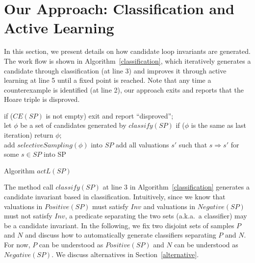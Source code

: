 \section{Our Approach: Classification and Active Learning}
\label{sec:classifierlearning}
In this section, we present details on how candidate loop invariants are generated. The work flow is shown in Algorithm~\ref{classification}, which iteratively generates a candidate through classification (at line 3) and improves it through active learning at line 5 until a fixed point is reached. Note that any time a counterexample is identified (at line 2), our approach exits and reports that the Hoare triple is disproved.

\begin{algorithm}[t]
\SetAlgoVlined
\Indm
\Indp
{} {
    if ($CE(SP)$ is not empty) { exit and report ``disproved''; } \\
    let $\phi$ be a set of candidates generated by $classify(SP)$\;
    if ($\phi$ is the same as last iteration){ return $\phi$; } \\
    add $selectiveSampling(\phi)$ into $SP$\;
    add all valuations $s'$ such that $s \Rightarrow s'$ for some $s \in SP$ into SP\;
}
\caption{Algorithm $actL(SP)$}
\label{classification}
\end{algorithm}

The method call $classify(SP)$ at line 3 in Algorithm~\ref{classification} generates a candidate invariant based in classification. Intuitively, since we know that valuations in $Positive(SP)$ must satisfy $Inv$ and valuations in $Negative(SP)$ must not satisfy $Inv$, a predicate separating the two sets (a.k.a.~a classifier) may be a candidate invariant. In the following, we fix two disjoint sets of samples $P$ and $N$ and discuss how to automatically generate classifiers separating $P$ and $N$. For now, $P$ can be understood as $Positive(SP)$ and $N$ can be understood as $Negative(SP)$. We discuss alternatives in Section~\ref{alternative}.

